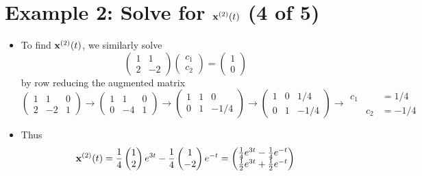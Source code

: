 \documentclass[11pt,a4paper]{article}
\begin{document}
	\section*{Example 2: Solve for $\vb{x}^{(2)}(t)$ (4 of 5)}
	\begin{itemize}
		\item To find $\vb{x}^{(2)}(t)$, we similarly solve
		$$
		\begin{pmatrix}
			1 & 1\\
			2 & -2
		\end{pmatrix}
		\begin{pmatrix}
			c_1\\
			c_2
		\end{pmatrix}=
		\begin{pmatrix}
			1\\
			0
		\end{pmatrix}
		$$
		by row reducing the augmented matrix\\
		$
		\begin{pmatrix}
			1 & 1 & 0\\
			2 & -2 & 1
		\end{pmatrix}\to
		\begin{pmatrix}
			1 & 1 & 0\\
			0 & -4 & 1
		\end{pmatrix}\to
		\begin{pmatrix}
			1 & 1 & 0\\
			0 & 1 & -1/4
		\end{pmatrix}\to
		\begin{pmatrix}
			1 & 0 & 1/4\\
			0 & 1 & -1/4
		\end{pmatrix}\to
		\begin{matrix}
			c_1 & & =1/4\\
			& c_2 & =-1/4
		\end{matrix}
		$
		\item Thus
		$$
		\vb{x}^{(2)}(t) = \frac{1}{4}
		\begin{pmatrix}
			1\\
			2
		\end{pmatrix}e^{3t} - \frac{1}{4}
		\begin{pmatrix}
			1\\
			-2
		\end{pmatrix}e^{-t}=
		\begin{pmatrix}
			\frac{1}{4}e^{3t} - \frac{1}{4}e^{-t}\\
			\frac{1}{2}e^{3t} + \frac{1}{2}e^{-t}
		\end{pmatrix}
		$$
	\end{itemize}
\end{document}
